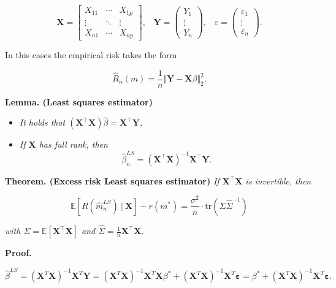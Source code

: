 \documentclass[
]{book}
\providecommand{\tightlist}{%
  \setlength{\itemsep}{0pt}\setlength{\parskip}{0pt}}
\begin{document}
\[
\mathbf{X}=
\begin{bmatrix}
X_{11} & \cdots & X_{1p}\\
\vdots & \ddots & \vdots\\
X_{n1} & \cdots & X_{np}
\end{bmatrix},\hspace{10pt} \mathbf{Y}=
\begin{pmatrix}
Y_1\\
\vdots\\
Y_n
\end{pmatrix},\hspace{10pt} \varepsilon=
\begin{pmatrix}
\varepsilon_1\\
\vdots\\
\varepsilon_n
\end{pmatrix}.
\]

In this cases the empirical risk takes the form

\[
\hat{R}_n(m)=\frac{1}{n}\Vert\mathbf{Y}-\mathbf{X}\beta \Vert^2_2.
\]

\textbf{Lemma. (Least squares estimator)}

\begin{itemize}
\tightlist
\item
  \emph{It holds that \((\mathbf{X}^\top\mathbf{X})\hat{\beta}=\mathbf{X}^\top \mathbf{Y}\),}
\item
  \emph{If \(\mathbf{X}\) has full rank, then}
  \[
    \hat{\beta}_n^{LS}=(\mathbf{X}^\top\mathbf{X})^{-1}\mathbf{X}^\top \mathbf{Y}.
    \]
\end{itemize}

\textbf{Theorem. (Excess risk Least squares estimator)} \emph{If \(\mathbf{X}^\top\mathbf{X}\) is invertible, then}

\[
\mathbb{E}[R(\hat{m}_n^{LS})\ \vert\ \mathbf{X}]-r(m^*)=\frac{\sigma^2}{n}\cdot \text{tr}\left(\Sigma\hat{\Sigma}^{-1}\right)
\]

\emph{with \(\Sigma=\mathbb{E}[\mathbf{X}^\top\mathbf{X}]\) and \(\hat{\Sigma}=\frac{1}{n}\mathbf{X}^\top\mathbf{X}\).}

\textbf{Proof.}

\[
\hat{\beta}^{LS}=\left(\mathbf{X}^T \mathbf{X}\right)^{-1} \mathbf{X}^T \mathbf{Y}=\left(\mathbf{X}^T \mathbf{X}\right)^{-1} \mathbf{X}^T \mathbf{X} \beta^*+\left(\mathbf{X}^T \mathbf{X}\right)^{-1} \mathbf{X}^T \mathbf{\varepsilon}=\beta^*+\left(\mathbf{X}^T \mathbf{X}\right)^{-1} \mathbf{X}^T \mathbf{\mathbf { \varepsilon }}.
\]
\end{document}
